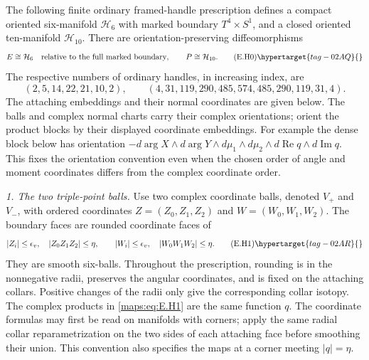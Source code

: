 \begin{theorem}\hypertarget{tag-02MM}{}\label{maps:src:E.2.21}


The following finite ordinary framed-handle prescription defines a
compact oriented six-manifold $\mathcal H_6$ with marked boundary
$T^4\times S^1$, and a closed oriented ten-manifold $\mathcal H_{10}$.
There are orientation-preserving diffeomorphisms
\[
 E\cong\mathcal H_6\quad\hbox{relative to the full marked boundary},
 \qquad P\cong\mathcal H_{10}.
 \tag{E.H0}\hypertarget{tag-02AQ}{}\label{maps:eq:E.H0}
\]
The respective numbers of ordinary handles, in increasing index, are
\[
 (2,5,14,22,21,10,2),\qquad
 (4,31,119,290,485,574,485,290,119,31,4).
\]
The attaching embeddings and their normal coordinates are given below.  
The balls and complex normal charts carry their complex orientations;
orient the product blocks by their displayed coordinate embeddings.
For example the dense block below has orientation
$-d\arg X\wedge d\arg Y\wedge d\mu_1\wedge d\mu_2
\wedge d\operatorname{Re}q\wedge d\operatorname{Im}q$.
This fixes the orientation convention even when the chosen order of
angle and moment coordinates differs from the complex coordinate order.

\emph{1. The two triple-point balls.}
Use two complex coordinate balls, denoted $V_+$ and $V_-$, with
ordered coordinates $Z=(Z_0,Z_1,Z_2)$ and $W=(W_0,W_1,W_2)$.
The boundary faces are rounded coordinate faces of
\[
 |Z_i|\leq\epsilon_v,\quad |Z_0Z_1Z_2|\leq\eta,
 \qquad
 |W_i|\leq\epsilon_v,\quad |W_0W_1W_2|\leq\eta.
 \tag{E.H1}\hypertarget{tag-02AR}{}\label{maps:eq:E.H1}
\]
They are smooth six-balls.  Throughout the prescription, rounding is
in the nonnegative radii, preserves the angular coordinates, and is
fixed on the attaching collars.  Positive changes of the radii only
give the corresponding collar isotopy.  The complex products in
\eqref{maps:eq:E.H1} are the same function $q$.
The coordinate formulas may first be read on manifolds with corners;
apply the same radial collar reparametrization on the two sides of
each attaching face before smoothing their union.  This convention
also specifies the maps at a corner meeting $|q|=\eta$.


\end{theorem}
